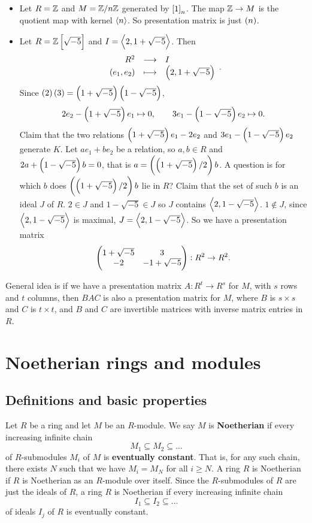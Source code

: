 \begin{example*}
\hfill
\begin{itemize}
\item Let $ R = \mathbb{Z} $ and $ M = \mathbb{Z} / n\mathbb{Z} $ generated by $ \sbr{1}_n $. The map $ \mathbb{Z} \to M $ is the quotient map with kernel $ \left\langle n \right\rangle $. So presentation matrix is just $ \br{n} $.
\item Let $ R = \Z\sbr{\sqrt{-5}} $ and $ I = \left\langle 2, 1 + \sqrt{-5} \right\rangle $. Then
$$ \function{R^2}{I}{\br{e_1, e_2}}{\br{2, 1 + \sqrt{-5}}}. $$
Since $ \br{2}\br{3} = \br{1 + \sqrt{-5}}\br{1 - \sqrt{-5}} $,
$$ 2e_2 - \br{1 + \sqrt{-5}}e_1 \mapsto 0, \qquad 3e_1 - \br{1 - \sqrt{-5}}e_2 \mapsto 0. $$
Claim that the two relations $ \br{1 + \sqrt{-5}}e_1 - 2e_2 $ and $ 3e_1 - \br{1 - \sqrt{-5}}e_2 $ generate $ K $. Let $ ae_1 + be_2 $ be a relation, so $ a, b \in R $ and $ 2a + \br{1 - \sqrt{-5}}b = 0 $, that is $ a = \br{\br{1 + \sqrt{-5}} / 2}b $. A question is for which $ b $ does $ \br{\br{1 + \sqrt{-5}} / 2}b $ lie in $ R $? Claim that the set of such $ b $ is an ideal $ J $ of $ R $. $ 2 \in J $ and $ 1 - \sqrt{-5} \in J $ so $ J $ contains $ \left\langle 2, 1 - \sqrt{-5} \right\rangle $. $ 1 \notin J $, since $ \left\langle 2, 1 - \sqrt{-5} \right\rangle $ is maximal, $ J = \left\langle 2, 1 - \sqrt{-5} \right\rangle $. So we have a presentation matrix
$$ \begin{pmatrix} 1 + \sqrt{-5} & 3 \\ -2 & -1 + \sqrt{-5} \end{pmatrix} : R^2 \to R^2. $$
\end{itemize}
\end{example*}

General idea is if we have a presentation matrix $ A : R^t \to R^s $ for $ M $, with $ s $ rows and $ t $ columns, then $ BAC $ is also a presentation matrix for $ M $, where $ B $ is $ s \times s $ and $ C $ is $ t \times t $, and $ B $ and $ C $ are invertible matrices with inverse matrix entries in $ R $.

\pagebreak

\section{Noetherian rings and modules}

\subsection{Definitions and basic properties}

\begin{definition}
Let $ R $ be a ring and let $ M $ be an $ R $-module. We say $ M $ is \textbf{Noetherian} if every increasing infinite chain
$$ M_1 \subseteq M_2 \subseteq \dots $$
of $ R $-submodules $ M_i $ of $ M $ is \textbf{eventually constant}. That is, for any such chain, there exists $ N $ such that we have $ M_i = M_N $ for all $ i \ge N $. A ring $ R $ is Noetherian if $ R $ is Noetherian as an $ R $-module over itself. Since the $ R $-submodules of $ R $ are just the ideals of $ R $, a ring $ R $ is Noetherian if every increasing infinite chain
$$ I_1 \subseteq I_2 \subseteq \dots $$
of ideals $ I_j $ of $ R $ is eventually constant.
\end{definition}

